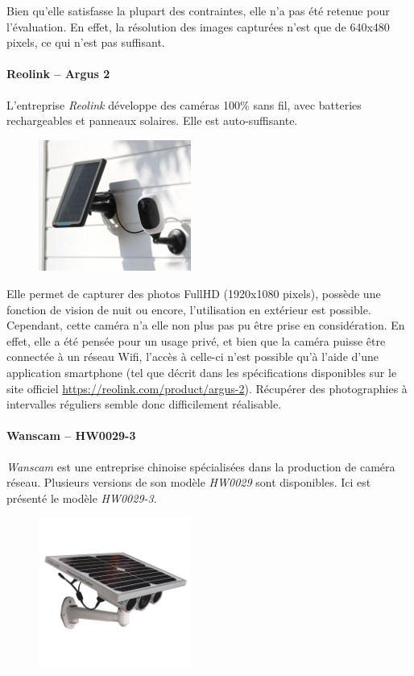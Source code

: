 Bien qu'elle satisfasse la plupart des contraintes, elle n'a pas été retenue pour l'évaluation. En effet, la résolution des images capturées n'est que de 640x480 pixels, ce qui n'est pas suffisant.

\paragraph{\textbf{Reolink} -- Argus 2}
L'entreprise \textit{Reolink} développe des caméras 100\% sans fil, avec batteries rechargeables et panneaux solaires. Elle est auto-suffisante.\autocite{cam:argus2}

\begin{figure}[ht]
    \includegraphics[width=50mm]{img/conception/argus2_cam.jpg}
    \centering
\end{figure}

Elle permet de capturer des photos FullHD (1920x1080 pixels), possède une fonction de vision de nuit ou encore, l'utilisation en extérieur est possible. Cependant, cette caméra n'a elle non plus pas pu être prise en considération. En effet, elle a été pensée pour un usage privé, et bien que la caméra puisse être connectée à un réseau Wifi, l'accès à celle-ci n'est possible qu'à l'aide d'une application smartphone (tel que décrit dans les spécifications disponibles sur le site officiel \url{https://reolink.com/product/argus-2}\autocite{cam:argus2}). Récupérer des photographies à intervalles réguliers semble donc difficilement réalisable.

\paragraph{\textbf{Wanscam} -- HW0029-3}

\textit{Wanscam} est une entreprise chinoise spécialisées dans la production de caméra réseau. Plusieurs versions de son modèle \textit{HW0029} sont disponibles. Ici est présenté le modèle \textit{HW0029-3}. \autocite{cam:wan3}

\begin{figure}[ht]
    \includegraphics[width=50mm]{img/conception/wan3_cam.jpg}
    \centering
\end{figure}

